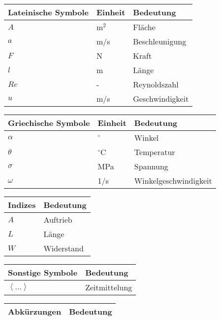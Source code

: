 
\begin{tabular}{p{5cm}p{4cm}p{5cm}}
	Lateinische Symbole & Einheit & Bedeutung       \\ \hline
	$A$                 & m$^2$   & Fläche          \\
	$a$                 & m/s     & Beschleunigung  \\
	$F$                 & N       & Kraft           \\
	$l$                 & m       & Länge           \\
	$Re$                & -       & Reynoldszahl    \\
	$u$                 & m/s     & Geschwindigkeit
\end{tabular}
\vspace{0.5cm}

\begin{tabular}{p{5cm}p{4cm}p{5cm}}
	Griechische Symbole & Einheit   & Bedeutung             \\ \hline
	$\alpha$            & $^\circ$  & Winkel                \\
	$\theta$            & $^\circ$C & Temperatur            \\
	$\sigma$            & MPa       & Spannung              \\
	$\omega$            & 1/s       & Winkelgeschwindigkeit
\end{tabular}

\vspace{0.5cm}

\begin{tabular}{p{7cm}p{7cm}}
	Indizes & Bedeutung  \\ \hline
	$A$     & Auftrieb   \\
	$L$     & Länge      \\
	$W$     & Widerstand
\end{tabular}

\vspace{0.5cm}

\begin{tabular}{p{7cm}p{7cm}}
	Sonstige Symbole                & Bedeutung     \\ \hline
	$\left\langle ...\right\rangle$ & Zeitmittelung
\end{tabular}

\vspace{0.5cm}

\begin{tabular}{p{7cm}p{7cm}}
	Abkürzungen & Bedeutung \\ \hline
\end{tabular}